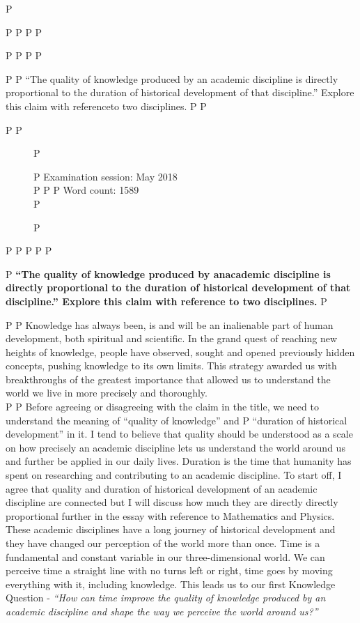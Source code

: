 P \documentclass[12pt,a4paper]{article}
\begin{document}
P 
P 
P 
P \maketitle
P 
P \doublespacing
P 
P \begin{center}
P 
P ``The quality of knowledge produced by an academic discipline is directly proportional to the duration of historical development of that discipline.'' Explore this claim with referenceto two disciplines.
P 
P \end{center}
P 
P \begin{figure}[b]
P \begin{flushleft}
P Examination session: May 2018\\
P %
P %
P Word count: 1589\\
P \end{flushleft}
P \end{figure}
P 
P \newpage
P 
P %
P \begin{center}
P \textbf{``The quality of knowledge produced by anacademic discipline is directly proportional to the duration of historical development of that discipline.'' Explore this claim with reference to two disciplines.}
P \end{center}
P 
P Knowledge has always been, is and will be an inalienable part of human development, both spiritual and scientific. In the grand quest of reaching new heights of knowledge, people have observed, sought and opened previously hidden concepts, pushing knowledge to its own limits. This strategy awarded us with breakthroughs of the greatest importance that allowed us to understand the world we live in more precisely and thoroughly. \\
P 
P Before agreeing or disagreeing with the claim in the title, we need to understand the meaning of ``quality of knowledge'' and
P ``duration of historical development'' in it. I tend to believe that quality should be understood as a scale on how precisely an academic discipline lets us understand the world around us and further be applied in our daily lives. Duration is the time that humanity has spent on researching and contributing to an academic discipline. To start off, I agree that quality and duration of historical development of an academic discipline are connected but I will discuss how much they are directly directly proportional further in the essay with reference to Mathematics and Physics. These academic disciplines have a long journey of historical development and they have changed our perception of the world more than once. Time is a fundamental and constant variable in our three-dimensional world\cite{time}. We can perceive time a straight line with no turns left or right, time goes by moving everything with it, including knowledge. This leads us to our first Knowledge Question - \textit{“How can time improve the quality of knowledge produced by an academic discipline and shape the way we perceive the world around us?”}\\
\end{document}
